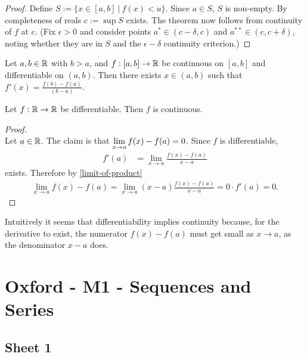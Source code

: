 \begin{proof}
  Define $S := \{x \in [a, b] ~|~ f(x) < u\}$. Since $a \in S$, $S$ is non-empty. By completeness
  of reals $c := \sup S$ exists. The theorem now follows from continuity of $f$ at $c$. (Fix
  $\epsilon > 0$ and consider points $a^* \in (c - \delta, c)$ and $a^{**} \in (c, c + \delta)$,
  noting whether they are in $S$ and the $\epsilon-\delta$ continuity criterion.)
\end{proof}

\begin{theorem*}
  Let $a, b \in \mathbb{R}$ with $b > a$, and $f:[a,b] \to \mathbb{R}$ be continuous on $[a, b]$ and differentiable
  on $(a, b)$. Then there exists $x \in (a, b)$ such that $f'(x) = \frac{f(b) - f(a)}{(b - a)}$.
\end{theorem*}


\begin{theorem*}
  Let $f:\mathbb{R}\to\mathbb{R}$ be differentiable. Then $f$ is continuous.
\end{theorem*}

\begin{proof}~\\
  Let $a \in \mathbb{R}$. The claim is that $\lim\limits_{x \to a} f(x) - f(a) = 0$. Since $f$ is differentiable,
  \begin{align*}
    f'(a) &= \lim_{x \to a} \frac{f(x) - f(a)}{x - a}
  \end{align*}
  exists. Therefore by \eqref{limit-of-product}
  \begin{align*}
    \lim_{x \to a} f(x) - f(a) = \lim_{x \to a} (x - a)\frac{f(x) - f(a)}{x - a} = 0\cdot f'(a) = 0.
  \end{align*}
\end{proof}

\begin{remark*}
  Intuitively it seems that differentiability implies continuity because, for the derivative to
  exist, the numerator $f(x) - f(a)$ must get small as $x\to a$, as the denominator $x - a$ does.
\end{remark*}


\newpage
\section{Oxford - M1 - Sequences and Series}

\subsection{Sheet 1}

